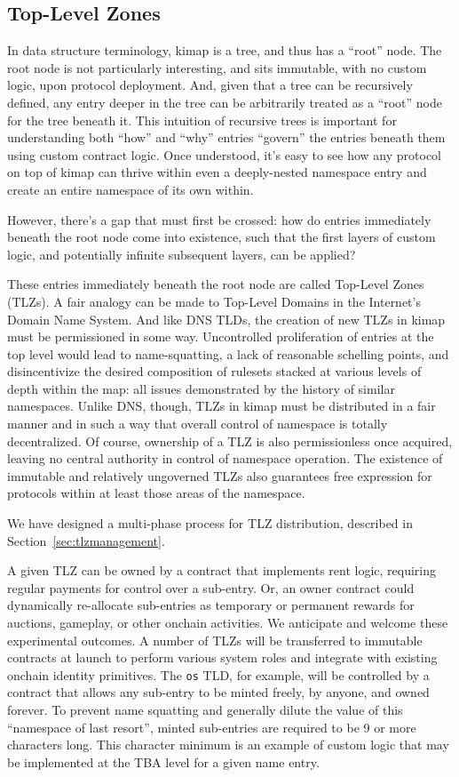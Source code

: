\documentclass[runningheads]{llncs}
\begin{document}
\subsection{Top-Level Zones}
\label{sec:tlz}

In data structure terminology, kimap is a tree, and thus has a ``root'' node.
The root node is not particularly interesting, and sits immutable, with no custom logic, upon protocol deployment.
And, given that a tree can be recursively defined, any entry deeper in the tree can be arbitrarily treated as a ``root'' node for the tree beneath it.
This intuition of recursive trees is important for understanding both ``how'' and ``why'' entries ``govern'' the entries beneath them using custom contract logic.
Once understood, it's easy to see how any protocol on top of kimap can thrive within even a deeply-nested namespace entry and create an entire namespace of its own within.

However, there's a gap that must first be crossed: how do entries immediately beneath the root node come into existence, such that the first layers of custom logic, and potentially infinite subsequent layers, can be applied?

These entries immediately beneath the root node are called Top-Level Zones (TLZs).
A fair analogy can be made to Top-Level Domains in the Internet's Domain Name System.
And like DNS TLDs, the creation of new TLZs in kimap must be permissioned in some way.
Uncontrolled proliferation of entries at the top level would lead to name-squatting, a lack of reasonable schelling points, and disincentivize the desired composition of rulesets stacked at various levels of depth within the map: all issues demonstrated by the history of similar namespaces.
Unlike DNS, though, TLZs in kimap must be distributed in a fair manner and in such a way that overall control of namespace is totally decentralized.
Of course, ownership of a TLZ is also permissionless once acquired, leaving no central authority in control of namespace operation.
The existence of immutable and relatively ungoverned TLZs also guarantees free expression for protocols within at least those areas of the namespace.

We have designed a multi-phase process for TLZ distribution, described in Section~\ref{sec:tlzmanagement}.

A given TLZ can be owned by a contract that implements rent logic, requiring regular payments for control over a sub-entry.
Or, an owner contract could dynamically re-allocate sub-entries as temporary or permanent rewards for auctions, gameplay, or other onchain activities.
We anticipate and welcome these experimental outcomes.
A number of TLZs will be transferred to immutable contracts at launch to perform various system roles and integrate with existing onchain identity primitives.
The \verb|os| TLD, for example, will be controlled by a contract that allows any sub-entry to be minted freely, by anyone, and owned forever.
To prevent name squatting and generally dilute the value of this ``namespace of last resort'', minted sub-entries are required to be 9 or more characters long.
This character minimum is an example of custom logic that may be implemented at the TBA level for a given name entry.
\end{document}
